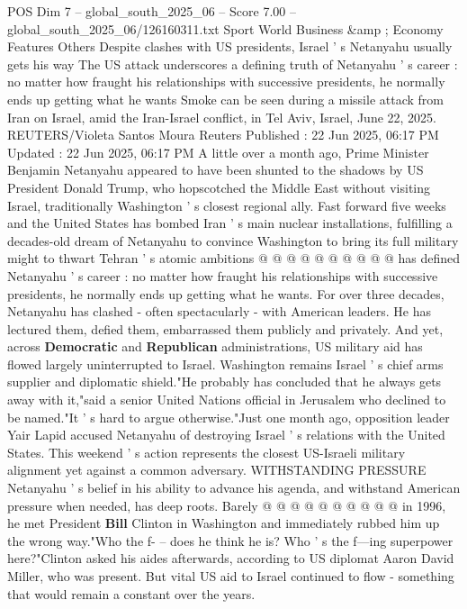 \begin{textsample}{POS Dim 7 – global\_south\_2025\_06 – Score 7.00 – global\_south\_2025\_06/126160311.txt}  \label{ex:f7_pos_397}
Sport World Business \&amp ; Economy Features Others Despite clashes with US presidents, Israel ' s Netanyahu usually gets his way The US attack underscores a defining truth of Netanyahu ' s career : no matter how fraught his relationships with successive presidents, he normally ends up getting what he wants Smoke can be seen during a missile attack from Iran on Israel, amid the Iran-Israel conflict, in Tel Aviv, Israel, June 22, 2025.
REUTERS/Violeta Santos Moura Reuters Published : 22 Jun 2025, 06:17 PM Updated : 22 Jun 2025, 06:17 PM A little over a month ago, Prime Minister Benjamin Netanyahu appeared to have been shunted to the shadows by US President Donald Trump, who hopscotched the Middle East without visiting Israel, traditionally Washington ' s closest regional ally.
Fast forward five weeks and the United States has bombed Iran ' s main nuclear installations, fulfilling a decades-old dream of Netanyahu to convince Washington to bring its full military might to thwart Tehran ' s atomic ambitions @ @ @ @ @ @ @ @ @ @ has defined Netanyahu ' s career : no matter how fraught his relationships with successive presidents, he normally ends up getting what he wants.
For over three decades, Netanyahu has clashed - often spectacularly - with American leaders.
He has lectured them, defied them, embarrassed them publicly and privately.
And yet, across \textbf{Democratic} and \textbf{Republican} administrations, US military aid has flowed largely uninterrupted to Israel.
Washington remains Israel ' s chief arms supplier and diplomatic shield."He probably has concluded that he always gets away with it,"said a senior United Nations official in Jerusalem who declined to be named."It ' s hard to argue otherwise."Just one month ago, opposition leader Yair Lapid accused Netanyahu of destroying Israel ' s relations with the United States.
This weekend ' s action represents the closest US-Israeli military alignment yet against a common adversary.
WITHSTANDING PRESSURE Netanyahu ' s belief in his ability to advance his agenda, and withstand American pressure when needed, has deep roots.
Barely @ @ @ @ @ @ @ @ @ @ in 1996, he met President \textbf{Bill} Clinton in Washington and immediately rubbed him up the wrong way."Who the f- -- does he think he is?
Who ' s the f---ing superpower here?"Clinton asked his aides afterwards, according to US diplomat Aaron David Miller, who was present.
But vital US aid to Israel continued to flow - something that would remain a constant over the years.

\end{textsample}
